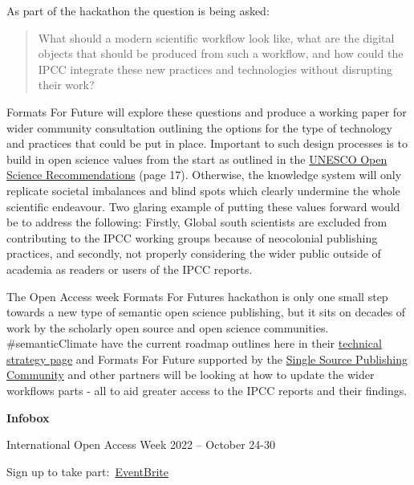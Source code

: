 \documentclass{article}
\begin{document}
As part of the hackathon the question is being asked: 

\begin{quote}



What should a modern scientific workflow look like, what are the digital objects that should be produced from such a workflow, and how could the IPCC integrate these new practices and technologies without disrupting their work? 


\end{quote}


Formats For Future will explore these questions and produce a working paper for wider community consultation outlining the options for the type of technology and practices that could be put in place. Important to such design processes is to build in open science values from the start as outlined in the \href{https://en.unesco.org/science-sustainable-future/open-science/recommendation}{UNESCO Open Science Recommendations} (page 17). Otherwise, the knowledge system will only replicate societal imbalances and blind spots which clearly undermine the whole scientific endeavour. Two glaring example of putting these values forward would be to address the following: Firstly, Global south scientists are excluded from contributing to the IPCC working groups because of neocolonial publishing practices, and secondly, not properly considering the wider public outside of academia as readers or users of the IPCC reports.





The Open Access week Formats For Futures hackathon is only one small step towards a new type of semantic open science publishing, but it sits on decades of work by the scholarly open source and open science communities. \#semanticClimate have the current roadmap outlines here in their \href{https://github.com/petermr/semanticClimate/tree/main/ipcc/ar6/wg3#readme}{technical strategy page} and Formats For Future supported by the \href{https://github.com/singlesourcepub/community}{Single Source Publishing Community} and other partners will be looking at how to update the wider workflows parts - all to aid greater access to the IPCC reports and their findings.


\textbf{Infobox}


International Open Access Week 2022 – October 24-30


Sign up to take part: \href{https://www.eventbrite.co.uk/e/formats-for-future-liberating-and-semantify-ipcc-reports-tickets-439057261087}{EventBrite}
\end{document}
